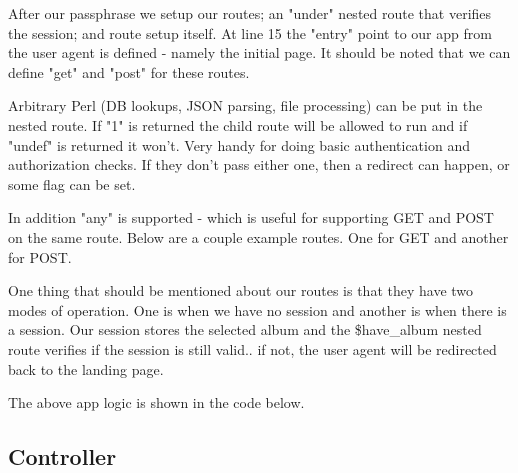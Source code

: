 \documentclass[14pt]{extreport}
\newcommand\Small{\fontsize{12}{13.0}\fontencoding{T1}\selectfont}
\newcommand*\LSTfont{\Small\ttfamily\SetTracking{encoding=*}{-60}\lsstyle}
\begin{document}


After our passphrase we setup our routes; an "under" nested route that verifies
the session; and route setup itself.  At line 15 the "entry" point to our app
from the user agent is defined - namely the initial page.  It should be noted
that we can define "get" and "post" for these routes.  



Arbitrary Perl (DB lookups, JSON parsing, file processing) can be put in the
nested route.  If "1" is returned the child route will be allowed to run and if
"undef" is returned it won't.  Very handy for doing basic authentication and
authorization checks.  If they don't pass either one, then a redirect can
happen, or some flag can be set.

In addition "any" is supported - which is useful for supporting GET and POST on
the same route.  Below are a couple example routes.  One for GET and another
for POST.



One thing that should be mentioned about our routes is that they have two modes of
operation.  One is when we have no session and another is when there is a session.
Our session stores the selected album and the \$have\_album nested route verifies
if the session is still valid.. if not, the user agent will be redirected back to the
landing page.

The above app logic is shown in the code below.



\subsection{Controller}
\end{document}
